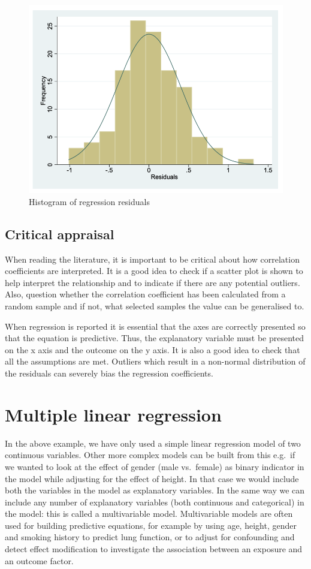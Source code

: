\documentclass[
]{memoir}
\begin{document}
\begin{figure}
\includegraphics[width=0.66\linewidth]{img/mod08/regression-residual-histogram} \caption{Histogram of regression residuals}\label{fig:residual-hist}
\end{figure}

\hypertarget{critical-appraisal}{%
\subsection{Critical appraisal}\label{critical-appraisal}}

When reading the literature, it is important to be critical about how correlation coefficients are interpreted. It is a good idea to check if a scatter plot is shown to help interpret the relationship and to indicate if there are any potential outliers. Also, question whether the correlation coefficient has been calculated from a random sample and if not, what selected samples the value can be generalised to.

When regression is reported it is essential that the axes are correctly presented so that the equation is predictive. Thus, the explanatory variable must be presented on the x axis and the outcome on the y axis. It is also a good idea to check that all the assumptions are met. Outliers which result in a non-normal distribution of the residuals can severely bias the regression coefficients.

\hypertarget{multiple-linear-regression}{%
\section{Multiple linear regression}\label{multiple-linear-regression}}

In the above example, we have only used a simple linear regression model of two continuous variables. Other more complex models can be built from this e.g.~if we wanted to look at the effect of gender (male vs.~female) as binary indicator in the model while adjusting for the effect of height. In that case we would include both the variables in the model as explanatory variables. In the same way we can include any number of explanatory variables (both continuous and categorical) in the model: this is called a multivariable model. Multivariable models are often used for building predictive equations, for example by using age, height, gender and smoking history to predict lung function, or to adjust for confounding and detect effect modification to investigate the association between an exposure and an outcome factor.
\end{document}
